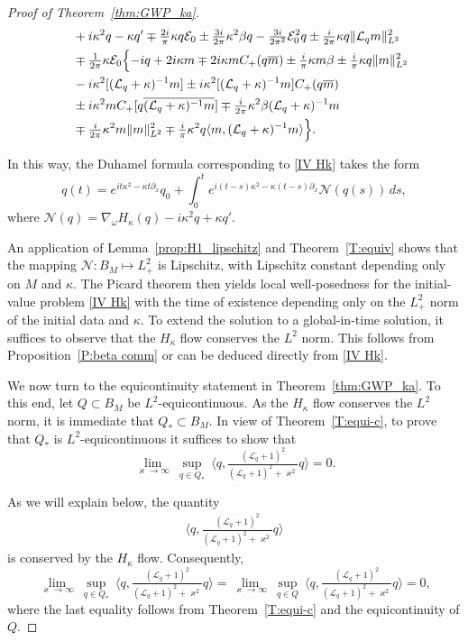 \documentclass{amsart}
\numberwithin{equation}{section}
\theoremstyle{definition}
\newcommand{\om}{\omega}
\newcommand{\ka}{\kappa}
\newcommand{\E}{\mathcal{E}}
\newcommand{\Lc}{\mathcal{L}}
\newcommand{\na}{\nabla}
\newcommand{\dd}{\partial}
\newcommand{\lan}{\langle}
\newcommand{\ran}{\rangle}
\begin{document}
\begin{proof}[Proof of Theorem~\ref{thm:GWP_ka}]
\begin{align*}
&\quad+i\ka^2q -\ka q' \mp\tfrac{2i}{\pi}\ka q\E_0 \pm \tfrac{3i}{2\pi}\ka^2\beta q-\tfrac{3i}{2\pi^2}\E_0^2q\pm \tfrac{i}{2\pi}\ka q\| \Lc_q m\|_{L^2}^2\\
&\quad\mp\tfrac{1}{2\pi}\ka\E_0\Bigl\{-iq+2i\ka m\mp2i\ka m C_+(q\overline{m})\pm\tfrac{i}{\pi}\ka m\beta\pm\tfrac{i}{\pi}\ka q\|m\|^2_{L^2}\nonumber\\
&\quad-i \ka^2[(\Lc_q+\ka)^{-1}m]\pm i\ka^2[(\Lc_q+\ka)^{-1}m] C_+(q\overline{m})\nonumber\\
&\quad\pm i\ka^2 m C_+[q\overline{(\Lc_q+\ka)^{-1}m}]\mp\tfrac{i}{2\pi}\ka^2\beta(\Lc_q+\ka)^{-1}m\nonumber\\
&\quad\mp\tfrac{i}{2\pi}\ka^2 m\|m\|_{L^2}^2\mp\tfrac{i}{\pi}\ka^2 q\lan m,(\Lc_q+\ka)^{-1}m\ran\Bigr\}.
\end{align*}

In this way, the Duhamel formula corresponding to \eqref{IV Hk} takes the form
\begin{equation}\label{eqn:duhamel}
q(t)=e^{it\ka^2-\ka t\dd_x}q_0+\int_0^t e^{i(t-s)\ka^2-\ka(t-s)\dd_x} \mathcal{N}(q(s))\,ds,
\end{equation}
where $\mathcal{N}(q)=\na_\om H_\ka(q)-i\ka^2 q+\ka q'$. 

An application of Lemma~\ref{prop:H1_lipschitz} and Theorem~\ref{T:equiv} shows that the mapping $\mathcal{N}: B_M \mapsto L^2_+$ is Lipschitz, with Lipschitz constant depending only on $M$ and $\ka$. The Picard theorem then yields local well-posedness for the initial-value problem \eqref{IV Hk} with the time of existence depending only on the $L^2_+$ norm of the initial data and $\ka$.  To extend the solution to a global-in-time solution, it suffices to observe that the $H_\ka$ flow conserves the $L^2$ norm.  This follows from  Proposition~\ref{P:beta comm} or can be deduced directly from \eqref{IV Hk}.

We now turn to the equicontinuity statement in Theorem~\ref{thm:GWP_ka}.  To this end, let $Q\subset B_M$ be $L^2$-equicontinuous. As the $H_\ka$ flow conserves the $L^2$ norm, it is immediate that $Q_{\ast}\subset B_M$.  In view of Theorem~\ref{T:equi-c}, to prove that $Q_{\ast}$ is $L^2$-equicontinuous it suffices to show that
$$
\lim_{\varkappa\to\infty}\ \sup_{q\in Q_\ast}\ \bigl\langle q, \tfrac{(\Lc_q+1)^2}{(\Lc_q+1)^2+\varkappa^2} q \bigr\rangle =0.
$$

As we will explain below, the quantity 
\begin{align*}
\bigl\langle q, \tfrac{(\Lc_q+1)^2}{(\Lc_q+1)^2+\varkappa^2} q \bigr\rangle
\end{align*}
is conserved by the $H_\ka$ flow. Consequently,
$$
\lim_{\varkappa\to\infty}\ \sup_{q\in Q_\ast}\ \bigl\langle q, \tfrac{(\Lc_q+1)^2}{(\Lc_q+1)^2+\varkappa^2} q \bigr\rangle =
\lim_{\varkappa\to\infty}\ \sup_{q\in Q}\ \bigl\langle q, \tfrac{(\Lc_q+1)^2}{(\Lc_q+1)^2+\varkappa^2} q \bigr\rangle =0,
$$
where the last equality follows from Theorem~\ref{T:equi-c} and the equicontinuity of $Q$.


\end{proof}
\end{document}
